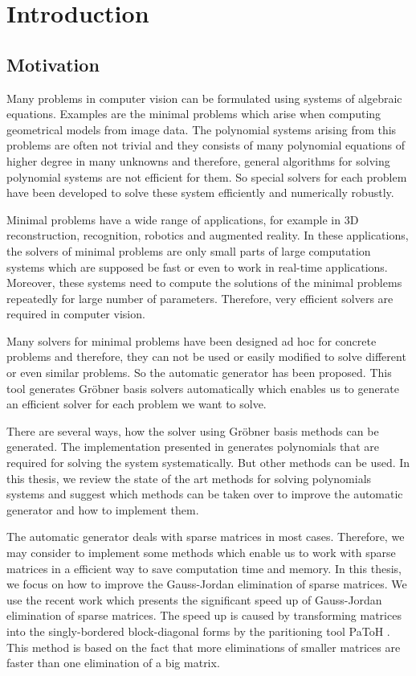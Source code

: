 \chapter{Introduction}
\section{Motivation}
Many problems in computer vision can be formulated using systems of algebraic equations. Examples are the minimal problems \cite{MinimalProblems} which arise when computing geometrical models from image data. The polynomial systems arising from this problems are often not trivial and they consists of many polynomial equations of higher degree in many unknowns and therefore, general algorithms for solving polynomial systems are not efficient for them. So special solvers for each problem have been developed to solve these system efficiently and numerically robustly.

Minimal problems have a wide range of applications, for example in 3D reconstruction, recognition, robotics and augmented reality. In these applications, the solvers of minimal problems are only small parts of large computation systems which are supposed be fast or even to work in real-time applications. Moreover, these systems need to compute the solutions of the minimal problems repeatedly for large number of parameters. Therefore, very efficient solvers are required in computer vision.

Many solvers for minimal problems have been designed ad hoc for concrete problems and therefore, they can not be used or easily modified to solve different or even similar problems. So the automatic generator \cite{AutoGen} has been proposed. This tool generates Gr\"obner basis solvers automatically which enables us to generate an efficient solver for each problem we want to solve.

There are several ways, how the solver using Gr\"obner basis methods can be generated. The implementation presented in \cite{AutoGen} generates polynomials that are required for solving the system systematically. But other methods can be used. In this thesis, we review the state of the art methods for solving polynomials systems and suggest which methods can be taken over to improve the automatic generator and how to implement them.

The automatic generator deals with sparse matrices in most cases. Therefore, we may consider to implement some methods which enable us to work with sparse matrices in a efficient way to save computation time and memory. In this thesis, we focus on how to improve the Gauss-Jordan elimination of sparse matrices. We use the recent work \cite{SBBD} which presents the significant speed up of Gauss-Jordan elimination of sparse matrices. The speed up is caused by transforming matrices into the singly-bordered block-diagonal forms by the paritioning tool PaToH \cite{PaToH}. This method is based on the fact that more eliminations of smaller matrices are faster than one elimination of a big matrix.

